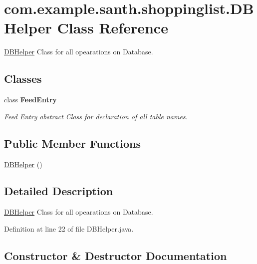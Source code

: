 \hypertarget{classcom_1_1example_1_1santh_1_1shoppinglist_1_1_d_b_helper}{}\section{com.\+example.\+santh.\+shoppinglist.\+D\+B\+Helper Class Reference}
\label{classcom_1_1example_1_1santh_1_1shoppinglist_1_1_d_b_helper}


\hyperlink{classcom_1_1example_1_1santh_1_1shoppinglist_1_1_d_b_helper}{D\+B\+Helper} Class for all opearations on Database.  


\subsection*{Classes}
\begin{DoxyCompactItemize}
\item 
class {\bfseries Feed\+Entry}
\begin{DoxyCompactList}\small\item\em Feed Entry abstract Class for declaration of all table names. \end{DoxyCompactList}\end{DoxyCompactItemize}
\subsection*{Public Member Functions}
\begin{DoxyCompactItemize}
\item 
\hyperlink{classcom_1_1example_1_1santh_1_1shoppinglist_1_1_d_b_helper_acfe6e16dd1a3410e18a24a1ad59b79a6}{D\+B\+Helper} ()
\end{DoxyCompactItemize}


\subsection{Detailed Description}
\hyperlink{classcom_1_1example_1_1santh_1_1shoppinglist_1_1_d_b_helper}{D\+B\+Helper} Class for all opearations on Database. 

Definition at line 22 of file D\+B\+Helper.\+java.



\subsection{Constructor \& Destructor Documentation}
